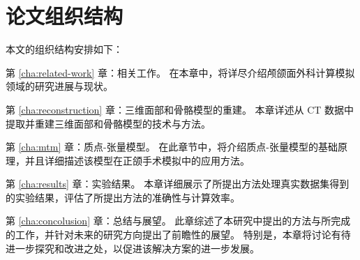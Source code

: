 \section{论文组织结构}

本文的组织结构安排如下：

第 \ref{cha:related-work} 章：相关工作。
在本章中，将详尽介绍颅颌面外科计算模拟领域的研究进展与现状。

第 \ref{cha:reconstruction} 章：三维面部和骨骼模型的重建。
本章详述从 CT 数据中提取并重建三维面部和骨骼模型的技术与方法。

第 \ref{cha:mtm} 章：质点-张量模型。
在此章节中，将介绍质点-张量模型的基础原理，并且详细描述该模型在正颌手术模拟中的应用方法。

第 \ref{cha:results} 章：实验结果。
本章详细展示了所提出方法处理真实数据集得到的实验结果，评估了所提出方法的准确性与计算效率。

第 \ref{cha:concolusion} 章：总结与展望。
此章综述了本研究中提出的方法与所完成的工作，并针对未来的研究方向提出了前瞻性的展望。
特别是，本章将讨论有待进一步探究和改进之处，以促进该解决方案的进一步发展。
